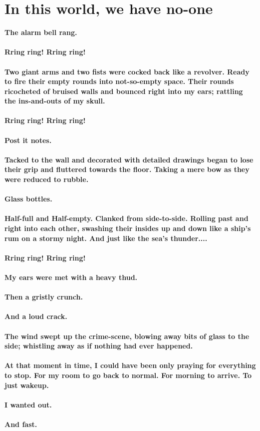 \documentclass{book}
\begin{document}
\chapter{In this world, we have no-one}
\Large{\textbf{The alarm bell rang.\\\\
	Rring ring! Rring ring!\\\\
	Two giant arms and two fists were cocked back like a revolver.
	Ready to fire their empty rounds into not-so-empty space.
	Their rounds ricocheted of bruised walls and bounced right into my ears;
	rattling the ins-and-outs of my skull.\\\\
	Rring ring! Rring ring!\\\\
	Post it notes.\\\\
	Tacked to the wall and decorated with detailed drawings began to
	lose their grip and fluttered towards the floor. Taking a mere bow as they
	were reduced to rubble.\\\\
    Glass bottles.\\\\
	Half-full and Half-empty. Clanked from side-to-side.
	Rolling past and right into each other,
	swashing their insides up and down like a ship's
	rum on a stormy night.
	And just like the sea's thunder....\\\\
	Rring ring! Rring ring!\\\\
	My ears were met with a heavy thud.\\\\
	Then a gristly crunch.\\\\
	And a loud crack.\\\\
	The wind swept up the crime-scene, blowing away bits
	of glass to the side; whistling away as if
	nothing had ever happened.\\\\
	At that moment in time, I could have been only praying for everything to stop.
	For my room to go back to normal. For morning to arrive. To just wakeup.\\\\
	I wanted out.\\\\
	And fast.\\\\
}}
\end{document}

